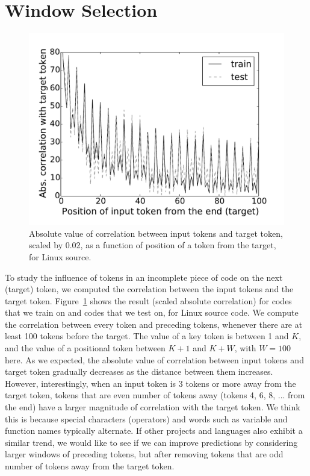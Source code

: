 \section{Window Selection}
\label{sec:window}

\begin{figure}
  \centering
  \includegraphics[width=\linewidth]{figs/correlation.pdf}
  \caption{Absolute value of correlation between input tokens and target token,
  scaled by 0.02, as a function of position of a token from the target,
  for Linux source.}
  \label{fig:correlation}
\end{figure}

\noindent
To study the influence of tokens in an incomplete piece of code on the next
(target) token, we computed the correlation between the input tokens and the
target token.
Figure~\ref{fig:correlation} shows the result (scaled absolute correlation) for
codes that we train on and codes that we test on, for Linux
source code.
We compute the correlation between every token and preceding tokens, whenever
there are at least 100 tokens before the target.
The value of a key token is between 1 and $K$, and the value of a positional
token between $K+1$ and $K+W$, with $W=100$ here.
As we expected, the absolute value of correlation between input tokens and
target token gradually decreases as the distance between them increases.
However, interestingly, when an input token is 3 tokens or more away from the
target token, tokens that are even number of tokens away (tokens 4, 6, 8, ...
from the end) have a larger magnitude of correlation with the target token.
We think this is because special characters (operators) and words such as variable and
function names typically alternate. If other projects and languages
also exhibit a similar trend, we would like to see if we can improve
predictions by considering larger windows of preceding tokens, but after
removing tokens that are odd number of tokens away from the target token.
